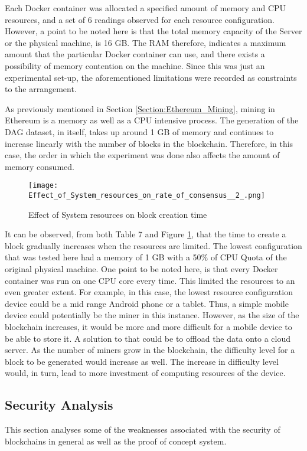 \documentclass[english]{tktltiki}
\begin{document}
Each Docker container was allocated a specified amount of memory and CPU resources, and a set of 6 readings observed for each resource configuration. However, a point to be noted here is that the total memory capacity of the Server or the physical machine, is 16 GB. The RAM therefore, indicates a maximum amount that the particular Docker container can use, and there exists a possibility of memory contention on the machine. Since this was just an experimental set-up, the aforementioned limitations were recorded as constraints to the arrangement. 

As previously mentioned in Section \ref{Section:Ethereum_Mining}, mining in Ethereum is a memory as well as a CPU intensive process. The generation of the DAG dataset, in itself, takes up around 1 GB of memory and continues to increase linearly with the number of blocks in the blockchain. Therefore, in this case, the order in which the experiment was done also affects the amount of memory consumed. 


\begin{figure}[H]
\begin{center}
\texttt{[image: Effect\_of\_System\_resources\_on\_rate\_of\_consensus\_\_2\_.png]}
\caption{Effect of System resources on block creation time}
\label{graph}
\end{center}
\end{figure}

It can be observed, from both Table 7 and Figure \ref{graph}, that the time to create a block gradually increases when the resources are limited. The lowest configuration that was tested here had a memory of 1 GB  with a 50\% of CPU Quota of the original physical machine. One point to be noted here, is that every Docker container was run on one CPU core every time. This limited the resources to an even greater extent. For example, in this case, the lowest resource configuration device could be a mid range Android phone or a tablet. Thus, a simple mobile device could potentially be the miner in this instance. However, as the size of the blockchain increases, it would be more and more difficult for a mobile device to be able to store it. A solution to that could be to offload the data onto a cloud server. As the number of miners grow in the blockchain, the difficulty level for a block to be generated would increase as well. The increase in difficulty level would, in turn, lead to more investment of computing resources of the device.

\subsection{Security Analysis} \label{Section: Security Analysis}
This section analyses some of the weaknesses associated with the security of blockchains in general as well as the proof of concept system. 
\end{document}
